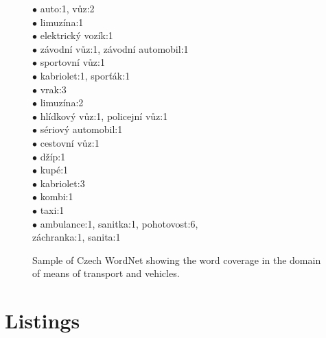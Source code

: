 \begin{figure}
{{\begin{multicols}{2}
\hspace*{0cm}$\bullet$ auto:1, vůz:2\\
\hspace*{1cm}$\bullet$ limuzína:1\\
\hspace*{1cm}$\bullet$ elektrický vozík:1\\
\hspace*{1cm}$\bullet$ závodní vůz:1, závodní automobil:1\\
\hspace*{1cm}$\bullet$ sportovní vůz:1\\
\hspace*{1cm}$\bullet$ kabriolet:1, sporťák:1\\
\hspace*{1cm}$\bullet$ vrak:3\\
\hspace*{1cm}$\bullet$ limuzína:2\\
\hspace*{1cm}$\bullet$ hlídkový vůz:1, policejní vůz:1\\
\hspace*{1cm}$\bullet$ sériový automobil:1\\
\hspace*{1cm}$\bullet$ cestovní vůz:1\\
\hspace*{1cm}$\bullet$ džíp:1\\
\hspace*{1cm}$\bullet$ kupé:1\\
\hspace*{1cm}$\bullet$ kabriolet:3\\
\hspace*{1cm}$\bullet$ kombi:1\\
\hspace*{1cm}$\bullet$ taxi:1\\
\hspace*{1cm}$\bullet$ ambulance:1, sanitka:1, pohotovost:6,\\
\hspace*{2cm} záchranka:1, sanita:1
\end{multicols}
\setlength{\columnsep}{5cm}
}}
	\caption{Sample of Czech WordNet showing the word coverage in the domain of means of transport and vehicles.}
	\label{fig:chX_czWordNet}
\end{figure}



\section{Listings}


